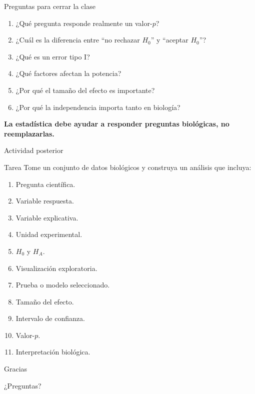 \documentclass[aspectratio=169,11pt]{beamer}
\begin{document}
\begin{frame}{Preguntas para cerrar la clase}

\begin{enumerate}
    \item ¿Qué pregunta responde realmente un valor-$p$?
    \item ¿Cuál es la diferencia entre ``no rechazar $H_0$''
    y ``aceptar $H_0$''?
    \item ¿Qué es un error tipo I?
    \item ¿Qué factores afectan la potencia?
    \item ¿Por qué el tamaño del efecto es importante?
    \item ¿Por qué la independencia importa tanto en biología?
\end{enumerate}

\vspace{0.5cm}

\centering
\Large
\textbf{La estadística debe ayudar a responder preguntas biológicas,
no reemplazarlas.}

\end{frame}

\begin{frame}{Actividad posterior}

\begin{block}{Tarea}
Tome un conjunto de datos biológicos y construya un análisis que incluya:
\end{block}

\begin{enumerate}
    \item Pregunta científica.
    \item Variable respuesta.
    \item Variable explicativa.
    \item Unidad experimental.
    \item $H_0$ y $H_A$.
    \item Visualización exploratoria.
    \item Prueba o modelo seleccionado.
    \item Tamaño del efecto.
    \item Intervalo de confianza.
    \item Valor-$p$.
    \item Interpretación biológica.
\end{enumerate}

\end{frame}

\begin{frame}
\centering
\Huge
\textcolor{bioGreen}{Gracias}

\vspace{0.5cm}

\Large
¿Preguntas?
\end{frame}

\end{document}

